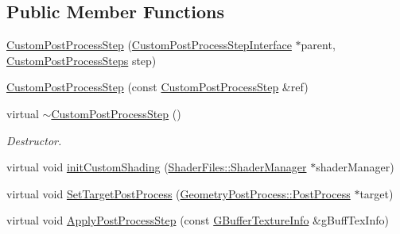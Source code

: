 \subsection*{Public Member Functions}
\begin{DoxyCompactItemize}
\item 
\mbox{\hyperlink{class_geometry_engine_1_1_custom_shading_1_1_custom_post_process_step_a3b1d958842bb403870e97a6bd6bf80bf}{Custom\+Post\+Process\+Step}} (\mbox{\hyperlink{class_geometry_engine_1_1_custom_shading_1_1_custom_post_process_step_interface}{Custom\+Post\+Process\+Step\+Interface}} $\ast$parent, \mbox{\hyperlink{namespace_geometry_engine_1_1_custom_shading_a09e44ca81de5fe08c6d50271d680c4b1}{Custom\+Post\+Process\+Steps}} step)
\item 
\mbox{\hyperlink{class_geometry_engine_1_1_custom_shading_1_1_custom_post_process_step_a9f86e6e457de8c5d855ce36072340300}{Custom\+Post\+Process\+Step}} (const \mbox{\hyperlink{class_geometry_engine_1_1_custom_shading_1_1_custom_post_process_step}{Custom\+Post\+Process\+Step}} \&ref)
\item 
\mbox{\label{class_geometry_engine_1_1_custom_shading_1_1_custom_post_process_step_a77ff320ac341ae882ac6beb435014594}} 
virtual \mbox{\hyperlink{class_geometry_engine_1_1_custom_shading_1_1_custom_post_process_step_a77ff320ac341ae882ac6beb435014594}{$\sim$\+Custom\+Post\+Process\+Step}} ()
\begin{DoxyCompactList}\small\item\em Destructor. \end{DoxyCompactList}\item 
virtual void \mbox{\hyperlink{class_geometry_engine_1_1_custom_shading_1_1_custom_post_process_step_a609c764a32b80f35f90fc4e8a12f01e4}{init\+Custom\+Shading}} (\mbox{\hyperlink{class_shader_files_1_1_shader_manager}{Shader\+Files\+::\+Shader\+Manager}} $\ast$shader\+Manager)
\item 
virtual void \mbox{\hyperlink{class_geometry_engine_1_1_custom_shading_1_1_custom_post_process_step_a44bb875476cb93976309a588bc9cb1c6}{Set\+Target\+Post\+Process}} (\mbox{\hyperlink{class_geometry_engine_1_1_geometry_post_process_1_1_post_process}{Geometry\+Post\+Process\+::\+Post\+Process}} $\ast$target)
\item 
virtual void \mbox{\hyperlink{class_geometry_engine_1_1_custom_shading_1_1_custom_post_process_step_a7d3a13a14a98277673dc52c74e38f038}{Apply\+Post\+Process\+Step}} (const \mbox{\hyperlink{class_geometry_engine_1_1_g_buffer_texture_info}{G\+Buffer\+Texture\+Info}} \&g\+Buff\+Tex\+Info)

\end{DoxyCompactItemize}

